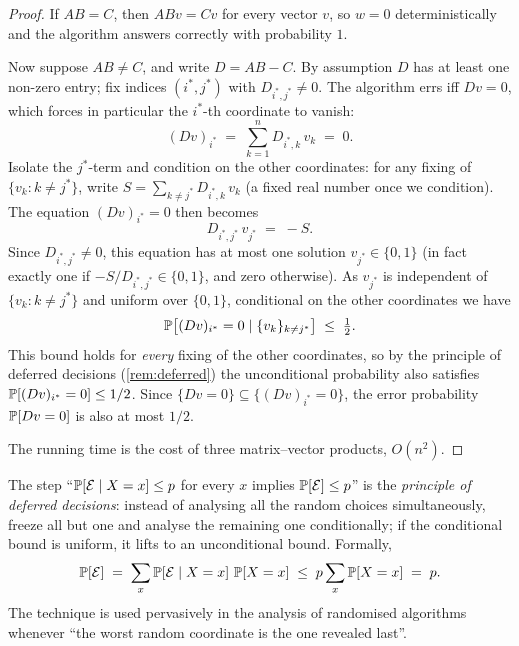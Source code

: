 \begin{proof}
If $AB = C$, then $ABv = Cv$ for every vector $v$, so $w = 0$ deterministically and the algorithm answers correctly with probability $1$.

Now suppose $AB \ne C$, and write $D = AB - C$. By assumption $D$ has at least one non-zero entry; fix indices $(i^*, j^*)$ with $D_{i^*, j^*} \ne 0$. The algorithm errs iff $Dv = 0$, which forces in particular the $i^*$-th coordinate to vanish:
\[
  (Dv)_{i^*} \;=\; \sum_{k=1}^{n} D_{i^*, k}\, v_k \;=\; 0.
\]
Isolate the $j^*$-term and condition on the other coordinates: for any fixing of $\{v_k : k \ne j^*\}$, write $S = \sum_{k \ne j^*} D_{i^*, k}\, v_k$ (a fixed real number once we condition). The equation $(Dv)_{i^*} = 0$ then becomes
\[
  D_{i^*, j^*}\, v_{j^*} \;=\; -S.
\]
Since $D_{i^*, j^*} \ne 0$, this equation has at most one solution $v_{j^*} \in \{0, 1\}$ (in fact exactly one if $-S/D_{i^*, j^*} \in \{0, 1\}$, and zero otherwise). As $v_{j^*}$ is independent of $\{v_k : k \ne j^*\}$ and uniform over $\{0, 1\}$, conditional on the other coordinates we have
\[
  \operatorname{\mathbb{P}}\bigl[(Dv)_{i^*} = 0 \mid \{v_k\}_{k \ne j^*}\bigr] \;\le\; \tfrac{1}{2}.
\]
This bound holds for \emph{every} fixing of the other coordinates, so by the principle of deferred decisions (\cref{rem:deferred}) the unconditional probability also satisfies $\operatorname{\mathbb{P}}[(Dv)_{i^*} = 0] \le 1/2$. Since $\{Dv = 0\} \subseteq \{(Dv)_{i^*} = 0\}$, the error probability $\operatorname{\mathbb{P}}[Dv = 0]$ is also at most $1/2$.

The running time is the cost of three matrix--vector products, $O(n^2)$.
\end{proof}

\begin{remark}
\label{rem:deferred}
The step ``$\operatorname{\mathbb{P}}[\mathcal{E} \mid X = x] \le p$ for every $x$ implies $\operatorname{\mathbb{P}}[\mathcal{E}] \le p$'' is the \emph{principle of deferred decisions}: instead of analysing all the random choices simultaneously, freeze all but one and analyse the remaining one conditionally; if the conditional bound is uniform, it lifts to an unconditional bound. Formally,
\[
  \operatorname{\mathbb{P}}[\mathcal{E}] \;=\; \sum_{x} \operatorname{\mathbb{P}}[\mathcal{E} \mid X = x]\, \operatorname{\mathbb{P}}[X = x] \;\le\; p \sum_x \operatorname{\mathbb{P}}[X = x] \;=\; p.
\]
The technique is used pervasively in the analysis of randomised algorithms whenever ``the worst random coordinate is the one revealed last''.
\end{remark}


